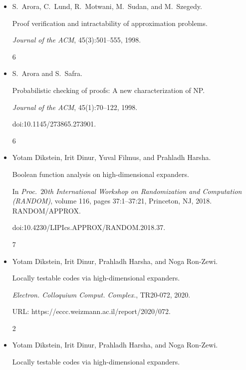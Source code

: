 \begin{itemize}


\item[] 
[1]

S. Arora, C. Lund, R. Motwani, M. Sudan, and M. Szegedy.


Proof verification and intractability of approximation problems.


\emph{Journal of the ACM}, 45(3):501–555, 1998.


6




\item[] 
[2]

S. Arora and S. Safra.


Probabilistic checking of proofs: A new characterization of NP.


\emph{Journal of the ACM}, 45(1):70–122, 1998.


doi:10.1145/273865.273901.


6




\item[] 
[3]

Yotam Dikstein, Irit Dinur, Yuval Filmus, and Prahladh Harsha.


Boolean function analysis on high-dimensional expanders.


In \emph{Proc. $20$th International Workshop on Randomization and
Computation (RANDOM)}, volume 116, pages 37:1–37:21, Princeton, NJ, 2018.
RANDOM/APPROX.


doi:10.4230/LIPIcs.APPROX/RANDOM.2018.37.


7




\item[] 
[4]

Yotam Dikstein, Irit Dinur, Prahladh Harsha, and Noga Ron-Zewi.


Locally testable codes via high-dimensional expanders.


\emph{Electron. Colloquium Comput. Complex.}, TR20-072, 2020.


URL: https://eccc.weizmann.ac.il/report/2020/072.


2




\item[] 
[5]

Yotam Dikstein, Irit Dinur, Prahladh Harsha, and Noga Ron-Zewi.


Locally testable codes via high-dimensional expanders.



\end{itemize}
